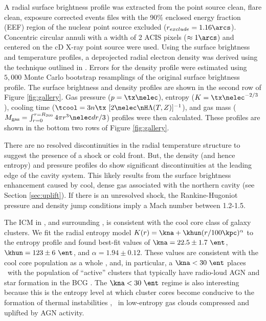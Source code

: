 \documentclass{emulateapj}
\begin{document}
A radial surface brightness profile was extracted from the point
source clean, flare clean, exposure corrected events files with the
90\% enclosed energy fraction (EEF) region of the nuclear point source
excluded ($r_{exclude} = 1.16\arcs$). Concentric circular annuli with
a width of 2 ACIS pixels ($\approx 1\arcs$) and centered on the cD
X-ray point source were used. Using the surface brightness and
temperature profiles, a deprojected radial electron density was
derived using the technique outlined in \citet{kriss83}. Errors for
the density profile were estimated using $5,000$ Monte Carlo bootstrap
resamplings of the original surface brightness profile. The surface
brightness and density profiles are shown in the second row of Figure
\ref{fig:gallery}. Gas pressure ($p = \tx \nelec$), entropy ($K =
\tx\nelec^{-2/3}$), cooling time ($\tcool = 3n\tx~[2\nelec \nH
  \Lambda(T,Z)]^{-1}$), and gas mass ($M_{\mathrm{gas}} =
\int_{r=0}^{r=R_{200}} 4 \pi r^3 \nelec dr/3$) profiles were then
calculated. These profiles are shown in the bottom two rows of Figure
\ref{fig:gallery}.

There are no resolved discontinuities in the radial temperature
structure to suggest the presence of a shock or cold front. But, the
density (and hence entropy) and pressure profiles do show significant
discontinuities at the leading edge of the cavity system. This likely
results from the surface brightness enhancement caused by cool, dense
gas associated with the northern cavity (see Section
\ref{sec:uplift}). If there is an unresolved shock, the
Rankine-Hugoniot pressure and density jump conditions imply a Mach
number between 1.2-1.5.

The ICM in \rxj, and surrounding \iras, is consistent with the cool
core class of galaxy clusters.  We fit the radial entropy model $K(r)
= \kna +\khun (r/100\kpc)^{\alpha}$ to the entropy profile and found
best-fit values of $\kna = 22.5 \pm 1.7~\ent$, $\khun = 123 \pm 6
~\ent$, and $\alpha = 1.94 \pm 0.12$. These values are consistent with
the cool core population as a whole \citep{accept}, and, in
particular, a $\kna < 30 ~\ent$ places \rxj\ with the population of
``active'' clusters that typically have radio-loud AGN and star
formation in the BCG \citep{haradent, 2008ApJ...687..899R}. The $\kna
< 30 ~\ent$ regime is also interesting because this is the entropy
level at which cluster cores become conducive to the formation of
thermal instabilities \citep{conduction}, \eg\ in low-entropy gas
clouds compressed and uplifted by AGN activity.
\end{document}
